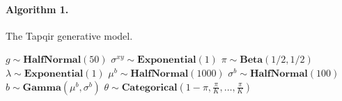 \paragraph{Algorithm 1.} The Tapqir generative model. \\

\begin{algorithmic}[1]
\State $g \sim \mathbf{HalfNormal}(50)$
\State $\sigma^{xy} \sim \mathbf{Exponential}(1)$
\State $\pi \sim \mathbf{Beta}(1/2, 1/2)$
\State $\lambda \sim \mathbf{Exponential}(1)$
    \State $\mu^b \sim \mathbf{HalfNormal}(1000)$
    \State $\sigma^b \sim \mathbf{HalfNormal}(100)$
        \State $b \sim \mathbf{Gamma}(\mu^b, \sigma^b)$
        \State $\theta \sim \mathbf{Categorical}\left(1 - \pi, \frac{\pi}{K}, \dots, \frac{\pi}{K}\right)$
        

\end{algorithmic}
